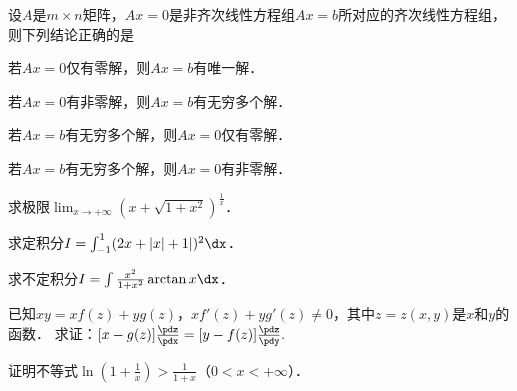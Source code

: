 \documentclass[plain,noanswer,medmath]{../../template/jnuexam}
\begin{document}
\begin{problem}
设$A$是$m \times n$矩阵，$Ax = 0$是非齐次线性方程组$Ax = b$所对应的齐次线性方程组，
则下列结论正确的是\pickout{}
\begin{abcd}
\item 若$Ax = 0$仅有零解，则$Ax = b$有唯一解．
\item 若$Ax = 0$有非零解，则$Ax = b$有无穷多个解．
\item 若$Ax = b$有无穷多个解，则$Ax = 0$仅有零解．
\item 若$Ax = b$有无穷多个解，则$Ax = 0$有非零解．
\end{abcd}
\end{problem}





\begin{problem}
求极限$\lim_{x \to +\infty} (x + \sqrt{1 + x^2})^{\frac{1}{x}}$．
\end{problem}



\begin{problem}
求定积分$I = \int_{-1}^1(2x + |x| + 1|)^2 \dx$．
\end{problem}



\begin{problem}
求不定积分$I = \int \frac{x^2}{1 + x^2} \arctan x\dx$．
\end{problem}



\begin{problem}
已知$xy = xf(z) + yg(z)$，$xf'(z) + yg'(z) \ne 0$，其中$z = z(x,y)$是$x$和$y$的函数．
求证：$[x - g(z)]\frac{\pdz}{\pdx} = [y - f(z)]\frac{\pdz}{\pdy}.$
\end{problem}



%



%



\begin{problem}
证明不等式$\ln \left(1 + \frac{1}{x} \right) > \frac{1}{1 + x}$（$0 < x < +\infty$）．
\end{problem}
\end{document}
